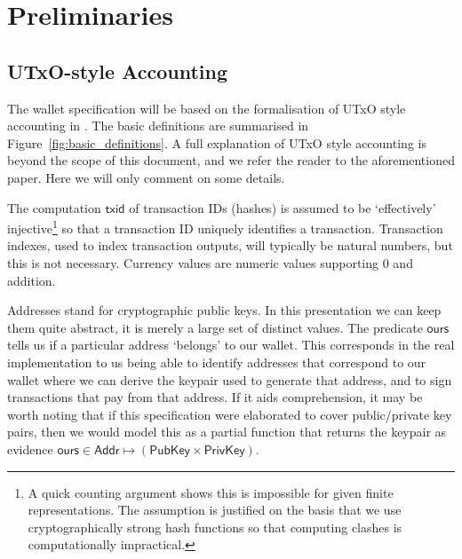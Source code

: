 \documentclass{article}
\numberwithin{equation}{lemma}
\begin{document}

\pagebreak

\section{Preliminaries}

\subsection{UTxO-style Accounting}

The wallet specification will be based on the formalisation of UTxO style
accounting in \citep{utxo_accounting}. The basic definitions are summarised in
Figure~\ref{fig:basic_definitions}. A full explanation of UTxO style accounting
is beyond the scope of this document, and we refer the reader to the
aforementioned paper. Here we will only comment on some details.

The computation $\mathsf{txid}$ of transaction IDs (hashes) is assumed to be
`effectively' injective\footnote{A quick counting argument shows this is
impossible for given finite representations. The assumption is justified on the
basis that we use cryptographically strong hash functions so that computing
clashes is computationally impractical.} so that a transaction ID uniquely
identifies a transaction. Transaction indexes, used to index transaction
outputs, will typically be natural numbers, but this is not necessary. Currency
values are numeric values supporting 0 and addition.

Addresses stand for cryptographic public keys. In this presentation we can keep
them quite abstract, it is merely a large set of distinct values. The predicate
$\mathsf{ours}$ tells us if a particular address `belongs' to our wallet.
This corresponds in the real implementation to us being able to identify
addresses that correspond to our wallet where we can derive the keypair used
to generate that address, and to sign transactions that pay from that address.
If it aids comprehension, it may be worth noting that if this specification
were elaborated to cover public/private key pairs, then we would model this as
a partial function that returns the keypair as evidence
$\mathsf{ours} \in \mathsf{Addr} \mapsto (\mathsf{PubKey} \times \mathsf{PrivKey})$.
\end{document}
